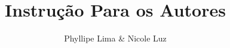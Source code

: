 \documentclass[10pt,twocolumn]{article}
\begin{document}

\title{\Huge \bf Instrução Para os Autores}

\author{\large 
Phyllipe Lima \&
Nicole Luz}

\maketitle






\printbibliography


\end{document}
